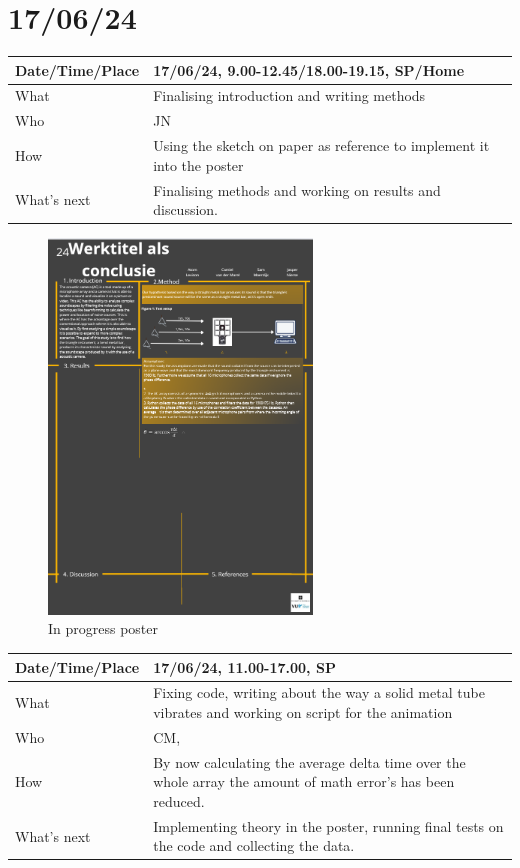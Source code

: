 \documentclass{article}
\begin{document}
\section{17/06/24}

\begin{table}[H]
\begin{tabular}{|p{1.5in}|p{4in}|}
\hline
Date/Time/Place & 17/06/24, 9.00-12.45/18.00-19.15, SP/Home \\ \hline
What            & Finalising introduction and writing methods \\ \hline
Who             & JN \\ \hline
How             & Using the sketch on paper as reference to implement it into the poster \\ \hline
What's next     & Finalising methods and working on results and discussion. \\ \hline
\end{tabular}
\end{table}

\begin{figure}[H]
    \centering
    \includegraphics[width=7cm]{inprogressposterV2.png}
    \caption{In progress poster}   
\end{figure}

\begin{table}[H]
\begin{tabular}{|p{1.5in}|p{4in}|}
\hline
Date/Time/Place & 17/06/24, 11.00-17.00, SP \\ \hline
What            & Fixing code, writing about the way a solid metal tube vibrates and working on script for the animation \\ \hline
Who             & CM,\\ \hline
How             & By now calculating the average delta time over the whole array the amount of math error's has been reduced. \\ \hline
What's next     & Implementing theory in the poster, running final tests on the code and collecting the data.  \\ \hline
\end{tabular}
\end{table}
\end{document}
